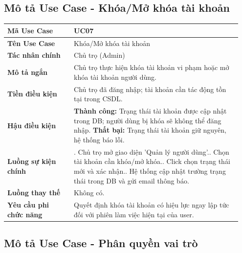 \documentclass[a4paper,oneside]{report}
\begin{document}
\subsection{Mô tả Use Case - Khóa/Mở khóa tài khoản}

\begin{longtable}[]{@{}>{\RaggedRight\arraybackslash}p{0.27\linewidth}>{\RaggedRight\arraybackslash}p{0.68\linewidth}@{}}
\toprule
\textbf{Mã Use Case} & UC07\tabularnewline
\midrule
\endhead
\textbf{Tên Use Case} & Khóa/Mở khóa tài khoản\tabularnewline
\textbf{Tác nhân chính} & Chủ trọ (Admin)\tabularnewline
\textbf{Mô tả ngắn} & Chủ trọ thực hiện khóa tài khoản vi phạm hoặc mở
khóa tài khoản người dùng.\tabularnewline
\textbf{Tiền điều kiện} & Chủ trọ đã đăng nhập; tài khoản cần tác động
tồn tại trong CSDL.\tabularnewline
\textbf{Hậu điều kiện} & \textbf{Thành công:} Trạng thái tài khoản được cập nhật trong DB; người dùng bị khóa sẽ không thể đăng nhập.\newline 
\textbf{Thất bại:} Trạng thái tài khoản giữ nguyên, hệ thống báo lỗi.\tabularnewline
\textbf{Luồng sự kiện chính} & 1. Chủ trọ mở giao
diện 'Quản lý người dùng'.\newline 2. Chọn tài khoản cần khóa/mở
khóa.\newline 3. Click chọn trạng thái mới và xác
nhận.\newline 4. Hệ thống cập nhật trường trạng thái trong DB và
gửi email thông báo.\tabularnewline
\textbf{Luồng thay thế} & Không có.\tabularnewline
\textbf{Yêu cầu phi chức năng} & Quyết định khóa tài khoản có hiệu lực
ngay lập tức đối với phiên làm việc hiện tại của user.\tabularnewline
\bottomrule
\end{longtable}

\subsection{Mô tả Use Case - Phân quyền vai trò}
\end{document}
